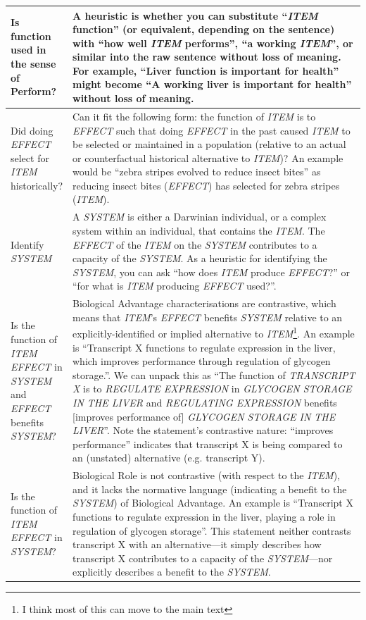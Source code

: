 \documentclass{article}
\begin{document}
\begin{landscape}
\begin{table}
\begin{tabular}{|p{0.17\linewidth}|p{0.97\linewidth}|}
    \hline
    Is function used in the sense of Perform? & A heuristic is whether you can substitute ``\emph{ITEM} function'' (or equivalent, depending on the sentence) with ``how well \emph{ITEM} performs'', ``a working \emph{ITEM}'', or similar into the raw sentence without loss of meaning. For example, ``Liver function is important for health'' might become ``A working liver is important for health'' without loss of meaning.\\
    \hline
    Did doing \emph{EFFECT} select for \emph{ITEM} historically? & Can it fit the following form: the function of \emph{ITEM} is to \emph{EFFECT} such that doing \emph{EFFECT} in the past caused \emph{ITEM} to be selected or maintained in a population (relative to an actual or counterfactual historical alternative to \emph{ITEM})? An example would be ``zebra stripes evolved to reduce insect bites'' as reducing insect bites (\emph{EFFECT}) has selected for zebra stripes (\emph{ITEM}).\\
    \hline
    Identify \emph{SYSTEM} & A \emph{SYSTEM} is either a Darwinian individual, or a complex system within an individual, that contains the \emph{ITEM}. The \emph{EFFECT} of the \emph{ITEM} on the \emph{SYSTEM} contributes to a capacity of the \emph{SYSTEM}. As a heuristic for identifying the \emph{SYSTEM}, you can ask  ``how does \emph{ITEM} produce \emph{EFFECT}?'' or ``for what is \emph{ITEM} producing \emph{EFFECT} used?''. \\
    \hline
    Is the function of \emph{ITEM} \emph{EFFECT} in \emph{SYSTEM} and \emph{EFFECT} benefits \emph{SYSTEM}? &  Biological Advantage characterisations are contrastive, which means that \emph{ITEM}'s \emph{EFFECT} benefits \emph{SYSTEM} relative to an explicitly-identified or implied alternative to \emph{ITEM}\footnote{I think most of this can move to the main text}. An example is ``Transcript X functions to regulate expression in the liver, which improves performance through regulation of glycogen storage.''. We can unpack this as ``The function of \emph{TRANSCRIPT X} is to \emph{REGULATE EXPRESSION} in \emph{GLYCOGEN STORAGE IN THE LIVER} and \emph{REGULATING EXPRESSION} benefits [improves performance of] \emph{GLYCOGEN STORAGE IN THE LIVER}''. Note the statement's contrastive nature: ``improves performance'' indicates that transcript X is being compared to an (unstated) alternative (e.g. transcript Y). \\
    \hline
    Is the function of \emph{ITEM} \emph{EFFECT} in \emph{SYSTEM}? &  Biological Role is not contrastive (with respect to the \emph{ITEM}), and it lacks the normative language (indicating a benefit to the \emph{SYSTEM}) of Biological Advantage. An example is ``Transcript X functions to regulate expression in the liver, playing a role in regulation of glycogen storage''. This statement neither contrasts transcript X with an alternative---it simply describes how transcript X contributes to a capacity of the \emph{SYSTEM}---nor explicitly describes a benefit to the \emph{SYSTEM}.  \\

\end{tabular}
\end{table}
\end{landscape}
\end{document}
